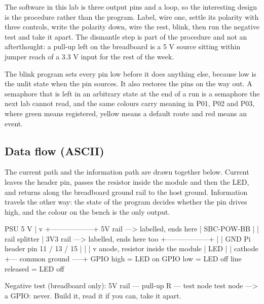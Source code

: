 
The software in this lab is three output pins and a loop, so the interesting design is the procedure rather than the program. Label, wire one, settle its polarity with three controls, write the polarity down, wire the rest, blink, then run the negative test and take it apart. The dismantle step is part of the procedure and not an afterthought: a pull-up left on the breadboard is a 5 V source sitting within jumper reach of a 3.3 V input for the rest of the week.

The blink program sets every pin low before it does anything else, because low is the unlit state when the pin sources. It also restores the pins on the way out. A semaphore that is left in an arbitrary state at the end of a run is a semaphore the next lab cannot read, and the same colours carry meaning in P01, P02 and P03, where green means registered, yellow means a default route and red means an event.

\subsection*{Data flow (ASCII)}

The current path and the information path are drawn together below. Current leaves the header pin, passes the resistor inside the module and then the LED, and returns along the breadboard ground rail to the host ground. Information travels the other way: the state of the program decides whether the pin drives high, and the colour on the bench is the only output.

\begin{asciiart}
   PSU 5 V
      |
      v
  +------------------+   5V rail  ---> labelled, ends here
  |   SBC-POW-BB     |
  |  rail splitter   |   3V3 rail ---> labelled, ends here too
  +------------------+
      |
      | GND            Pi header pin 11 / 13 / 15
      |                       |
      |                       v  anode, resistor inside the module
      |                     LED
      |                       |  cathode
      +--- common ground -----+   GPIO high = LED on
                                  GPIO low  = LED off
                                  line released = LED off

  Negative test (breadboard only):
      5V rail --- pull-up R --- test node
      test node ---> a GPIO:  never.  Build it, read it if you can, take it apart.
\end{asciiart}

